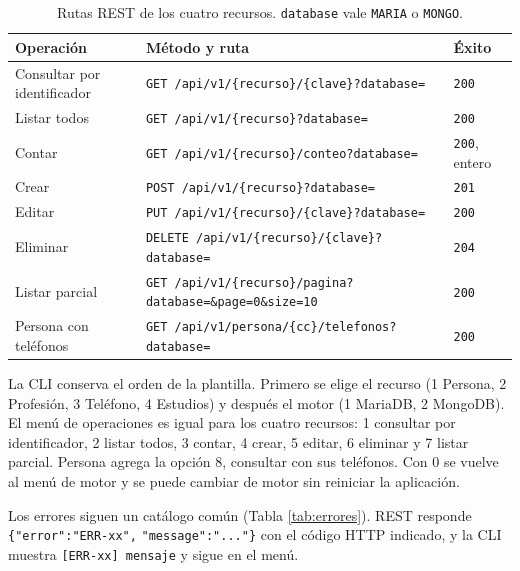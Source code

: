 \documentclass[11pt,a4paper]{article}
\begin{document}
\begin{table}[H]
\centering\small
\begin{tabularx}{\textwidth}{@{}p{3.3cm}>{\raggedright\arraybackslash}X p{2.3cm}@{}}
\toprule
\textbf{Operación}&\textbf{Método y ruta}&\textbf{Éxito}\\\midrule
Consultar por identificador&\texttt{GET /api/v1/\{recurso\}/\{clave\}?database=}&\texttt{200}\\
Listar todos&\texttt{GET /api/v1/\{recurso\}?database=}&\texttt{200}\\
Contar&\texttt{GET /api/v1/\{recurso\}/conteo?database=}&\texttt{200}, entero\\
Crear&\texttt{POST /api/v1/\{recurso\}?database=}&\texttt{201}\\
Editar&\texttt{PUT /api/v1/\{recurso\}/\{clave\}?database=}&\texttt{200}\\
Eliminar&\texttt{DELETE /api/v1/\{recurso\}/\{clave\}?database=}&\texttt{204}\\
Listar parcial&\texttt{GET /api/v1/\{recurso\}/pagina?database=\&page=0\&size=10}&\texttt{200}\\
Persona con teléfonos&\texttt{GET /api/v1/persona/\{cc\}/telefonos?database=}&\texttt{200}\\
\bottomrule
\end{tabularx}
\caption{Rutas REST de los cuatro recursos. \texttt{database} vale \texttt{MARIA} o \texttt{MONGO}.}
\label{tab:rutas}
\end{table}

La CLI conserva el orden de la plantilla. Primero se elige el recurso (1 Persona,
2 Profesión, 3 Teléfono, 4 Estudios) y después el motor (1 MariaDB, 2 MongoDB).
El menú de operaciones es igual para los cuatro recursos: 1 consultar por
identificador, 2 listar todos, 3 contar, 4 crear, 5 editar, 6 eliminar y 7 listar
parcial. Persona agrega la opción 8, consultar con sus teléfonos. Con 0 se vuelve
al menú de motor y se puede cambiar de motor sin reiniciar la aplicación.

Los errores siguen un catálogo común (Tabla \ref{tab:errores}). REST responde
\texttt{\{"error":"ERR-xx",} \texttt{"message":"..."\}} con el código HTTP indicado, y la
CLI muestra \texttt{[ERR-xx] mensaje} y sigue en el menú.
\end{document}
